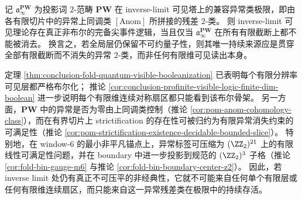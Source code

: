 \begin{conjecture}\label{conj:conclusion-inverse-limit-anomaly-global-quantumity}
记 \(\mathfrak a_\infty^{\mathbf{PW}}\) 为投影词 \(2\)-范畴 \(\mathbf{PW}\) 在 inverse-limit 可见塔上的兼容异常类极限，即由各有限切片中的异常上同调类 \([\mathrm{Anom}]\) 所拼接的残差 \(2\)-类。
则 inverse-limit 可见理论存在真正非布尔的完备尖事件逻辑，当且仅当 \(\mathfrak a_\infty^{\mathbf{PW}}\) 在所有有限截断上都不能被消去。
换言之，若全局层仍保留不可约量子性，则其唯一持续来源应是贯穿全部有限截断而不消失的异常 \(2\)-类，而非任何有限维可见读出本身。
\end{conjecture}

\begin{remark}[支持性理由]\label{rem:conclusion-inverse-limit-anomaly-global-quantumity-support}
定理 \ref{thm:conclusion-fold-quantum-visible-booleanization} 已表明每个有限分辨率可见层都严格布尔化；
推论 \ref{cor:conclusion-profinite-visible-logic-finite-dim-boolean} 进一步说明每个有限维连续对称扇区都只能看到该布尔骨架。
另一方面，\(\mathbf{PW}\) 中的异常是否为零由上同调类控制（推论 \ref{cor:pom-anom-cohomology-class}），而在有界切片上 strictification 的存在性可被归约为有限异常消失约束的可满足性（推论 \ref{cor:pom-strictification-existence-decidable-bounded-slice}）。
特别地，在 window-\(6\) 的最小非平凡锚点上，异常标签可压缩为 \((\ZZ_2)^{21}\) 上的有限线性可满足性问题，并在 boundary 中进一步投影到规范的 \((\ZZ_2)^3\) 子格（推论 \ref{cor:fold-bin-gauge-m6} 与推论 \ref{cor:fold-bin-boundary-center-z2}）。
因此，若 inverse limit 处仍有真正不可压平的非经典性，它就不可能来自任何单个有限层或任何有限维连续扇区，而只能来自这一异常残差类在极限中的持续存活。
\end{remark}

